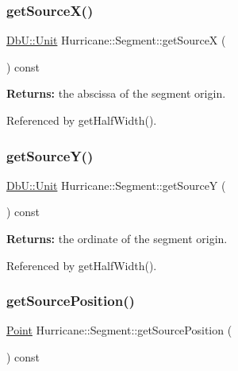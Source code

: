 \subsubsection{\texorpdfstring{get\+Source\+X()}{getSourceX()}}
{\footnotesize\ttfamily \hyperlink{group__DbUGroup_ga4fbfa3e8c89347af76c9628ea06c4146}{Db\+U\+::\+Unit} Hurricane\+::\+Segment\+::get\+SourceX (\begin{DoxyParamCaption}{ }\end{DoxyParamCaption}) const\hspace{0.3cm}{\ttfamily [pure virtual]}}

{\bfseries Returns\+:} the abscissa of the segment origin. 

Referenced by get\+Half\+Width().

\mbox{\label{classHurricane_1_1Segment_abf305dd4510de6fe6fae5286acbe285a}} 
\subsubsection{\texorpdfstring{get\+Source\+Y()}{getSourceY()}}
{\footnotesize\ttfamily \hyperlink{group__DbUGroup_ga4fbfa3e8c89347af76c9628ea06c4146}{Db\+U\+::\+Unit} Hurricane\+::\+Segment\+::get\+SourceY (\begin{DoxyParamCaption}{ }\end{DoxyParamCaption}) const\hspace{0.3cm}{\ttfamily [pure virtual]}}

{\bfseries Returns\+:} the ordinate of the segment origin. 

Referenced by get\+Half\+Width().

\mbox{\label{classHurricane_1_1Segment_a41c4b88c35b9af0ad741205d0a8ea9c2}} 
\subsubsection{\texorpdfstring{get\+Source\+Position()}{getSourcePosition()}}
{\footnotesize\ttfamily \hyperlink{classHurricane_1_1Point}{Point} Hurricane\+::\+Segment\+::get\+Source\+Position (\begin{DoxyParamCaption}{ }\end{DoxyParamCaption}) const\hspace{0.3cm}{\ttfamily [virtual]}}

